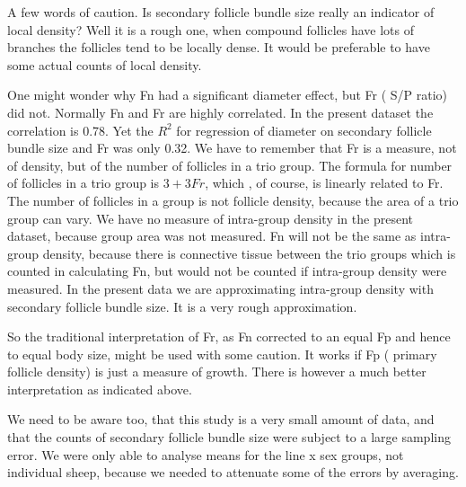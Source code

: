 \documentclass[titlepage]{article}  %
\begin{document}
A few words of caution. Is secondary follicle bundle size really an indicator of local density? Well it is a rough one, when compound follicles have lots of branches the follicles tend to be locally dense. It would be preferable to have some actual counts of local density. 

One might wonder why Fn had a significant diameter effect, but Fr ( S/P ratio) did not. Normally Fn and Fr are highly correlated. In the present dataset the correlation is 0.78. Yet the $R^{2}$ for regression of diameter on secondary follicle bundle size and Fr was only 0.32. We have to  remember that Fr is a measure, not of density, but of the number of follicles in a trio group. The formula for number of follicles in a trio group is $3 + 3Fr$, which , of course, is linearly related to Fr.  The number of follicles in a group is not follicle density, because the area of a trio group can vary. We have no measure of intra-group density in the present dataset, because group area was not measured. Fn will not be the same as intra-group density, because there is connective tissue between the trio groups which is counted in calculating Fn, but would not be counted if intra-group density were measured. In the present data we are approximating intra-group density with secondary follicle bundle size. It is a very rough approximation. 

So the traditional interpretation of Fr, as Fn corrected to an equal Fp and hence to equal body size, might be used with some caution.  It works if Fp ( primary follicle density) is just a measure of growth. There is however a much better interpretation as indicated above. 

We need to be aware too, that this study is a very small amount of data, and that the counts of secondary follicle bundle size were subject to a large sampling error. We were only able to analyse means for the line x sex groups, not individual sheep, because we needed to attenuate some of the errors by averaging.


\clearpage
\end{document}
